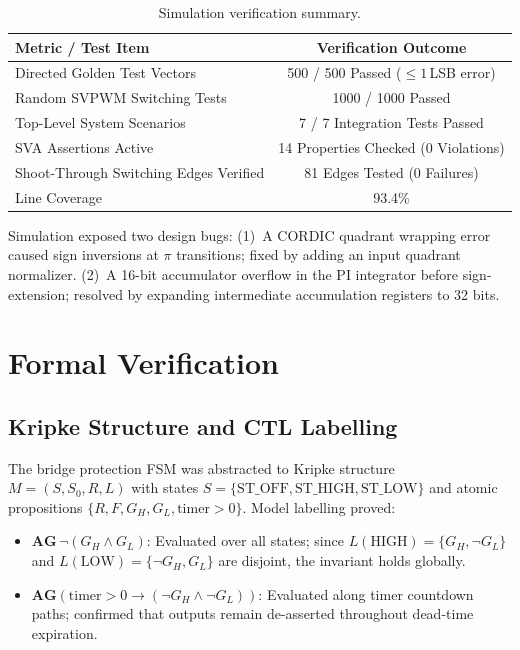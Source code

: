 \documentclass[11pt,a4paper]{article}
\begin{document}
\begin{table}[H]\centering\small
\caption{Simulation verification summary.}\label{tab:simsummary}
\begin{tabular}{@{}lc@{}}
\toprule
Metric / Test Item & Verification Outcome\\
\midrule
Directed Golden Test Vectors & 500 / 500 Passed ($\le 1$\,LSB error)\\
Random SVPWM Switching Tests & 1000 / 1000 Passed\\
Top-Level System Scenarios & 7 / 7 Integration Tests Passed\\
SVA Assertions Active & 14 Properties Checked (0 Violations)\\
Shoot-Through Switching Edges Verified & 81 Edges Tested (0 Failures)\\
Line Coverage & 93.4\%\\
\bottomrule
\end{tabular}
\end{table}

Simulation exposed two design bugs: (1)~A CORDIC quadrant wrapping error caused sign inversions at $\pi$ transitions; fixed by adding an input quadrant normalizer. (2)~A 16-bit accumulator overflow in the PI integrator before sign-extension; resolved by expanding intermediate accumulation registers to 32 bits.

\section{Formal Verification}
\label{sec:formal}

\subsection{Kripke Structure and CTL Labelling}
The bridge protection FSM was abstracted to Kripke structure $M = (S, S_0, R, L)$ with states $S = \{\text{ST\_OFF}, \text{ST\_HIGH}, \text{ST\_LOW}\}$ and atomic propositions $\{R, F, G_H, G_L, \text{timer} > 0\}$. Model labelling proved:
\begin{itemize}
  \item $\mathbf{AG}\,\neg(G_H \wedge G_L)$: Evaluated over all states; since $L(\text{HIGH}) = \{G_H, \neg G_L\}$ and $L(\text{LOW}) = \{\neg G_H, G_L\}$ are disjoint, the invariant holds globally.
  \item $\mathbf{AG}(\text{timer} > 0 \to (\neg G_H \wedge \neg G_L))$: Evaluated along timer countdown paths; confirmed that outputs remain de-asserted throughout dead-time expiration.
\end{itemize}
\end{document}
